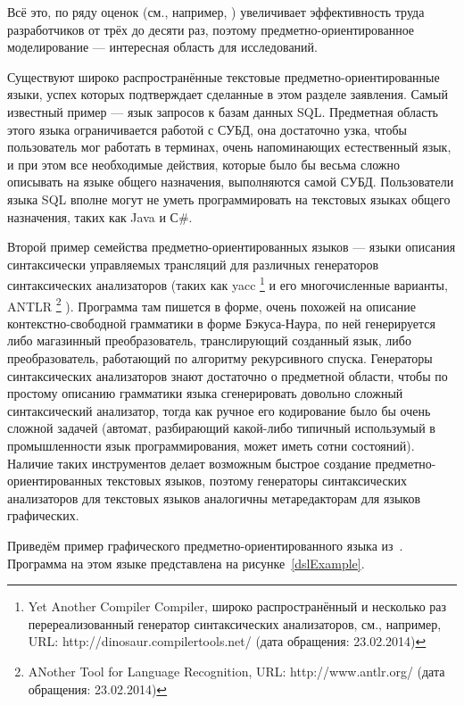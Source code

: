 Всё это, по ряду оценок (см., например, \cite{kieburtz1996software, kelly2000visual, gray2003examination})
увеличивает эффективность труда разработчиков от трёх до десяти раз, поэтому 
предметно-ориентированное моделирование --- интересная область для исследований.

Существуют широко распространённые текстовые предметно-ориентированные языки, 
успех которых подтверждает сделанные в этом разделе заявления. Самый известный 
пример --- язык запросов к базам данных SQL. Предметная область этого языка 
ограничивается работой с СУБД, она достаточно узка, чтобы пользователь мог 
работать в терминах, очень напоминающих естественный язык, и при этом все 
необходимые действия, которые было бы весьма сложно описывать на языке общего 
назначения, выполняются самой СУБД. Пользователи языка SQL вполне могут не уметь 
программировать на текстовых языках общего назначения, таких как Java и С\#. 

Второй пример семейства предметно-ориентированных языков --- языки описания 
синтаксически управляемых трансляций для различных генераторов синтаксических 
анализаторов (таких как yacc%
\footnote{Yet Another Compiler Compiler, широко распространённый и несколько раз перереализованный генератор 
синтаксических анализаторов, см., например, URL: http://dinosaur.compilertools.net/ (дата обращения: 23.02.2014)}
 и его многочисленные варианты, ANTLR%
\footnote{ANother Tool for Language Recognition, URL: http://www.antlr.org/ (дата обращения: 23.02.2014)}
). Программа там пишется в форме, очень похожей на описание контекстно-свободной 
грамматики в форме Бэкуса-Наура, по ней генерируется либо магазинный 
преобразователь, транслирующий созданный язык, либо преобразователь, работающий 
по алгоритму рекурсивного спуска. Генераторы синтаксических анализаторов знают 
достаточно о предметной области, чтобы по простому описанию грамматики языка 
сгенерировать довольно сложный синтаксический анализатор, тогда как ручное его 
кодирование было бы очень сложной задачей (автомат, разбирающий какой-либо 
типичный использумый в промышленности язык программирования, может иметь сотни 
состояний). Наличие таких инструментов делает возможным быстрое создание 
предметно-ориентированных текстовых языков, поэтому генераторы синтаксических 
анализаторов для текстовых языков аналогичны метаредакторам для языков 
графических.

Приведём пример графического предметно-ориентированного языка из~\cite{kelly2008domain}.
Программа на этом языке представлена на рисунке~\ref{dslExample}.

